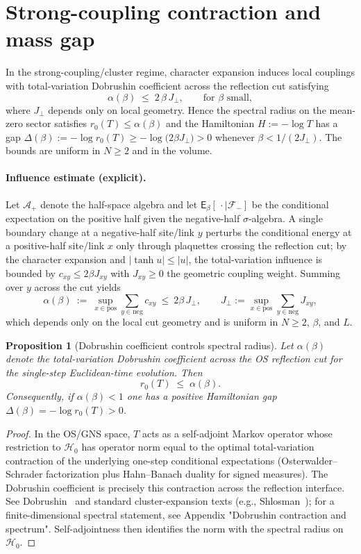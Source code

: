 \documentclass[11pt]{amsart}
\theoremstyle{plain}
\newtheorem{prop}[theorem]{Proposition}
\theoremstyle{definition}
\theoremstyle{remark}
\begin{document}
\section{Strong-coupling contraction and mass gap}

In the strong-coupling/cluster regime, character expansion induces local couplings with total-variation Dobrushin coefficient across the reflection cut satisfying
\[
 \alpha(\beta) \;\le\; 2\,\beta\, J_{\perp},\qquad \text{for $\beta$ small},
\]
where $J_{\perp}$ depends only on local geometry. Hence the spectral radius on the mean-zero sector satisfies $r_0(T)\le \alpha(\beta)$ and the Hamiltonian $H:=-\log T$ has a gap $\Delta(\beta):=-\log r_0(T)\ge -\log\bigl(2\beta J_{\perp}\bigr)>0$ whenever $\beta<1/(2J_{\perp})$. The bounds are uniform in $N\ge 2$ and in the volume.
\paragraph{Influence estimate (explicit).}
Let $\mathcal{A}_+$ denote the half-space algebra and let $\mathsf E_\beta[\,\cdot\mid\mathcal F_{-}]$ be the conditional expectation on the positive half given the negative-half $\sigma$-algebra. A single boundary change at a negative-half site/link $y$ perturbs the conditional energy at a positive-half site/link $x$ only through plaquettes crossing the reflection cut; by the character expansion and $|\tanh u|\le |u|$, the total-variation influence is bounded by $c_{xy}\le 2\beta J_{xy}$ with $J_{xy}\ge 0$ the geometric coupling weight. Summing over $y$ across the cut yields
\[
  \alpha(\beta)\ :=\ \sup_{x\in \text{pos}} \sum_{y\in \text{neg}} c_{xy}\ \le\ 2\beta\, J_{\perp},\qquad J_{\perp}:=\sup_{x\in \text{pos}} \sum_{y\in \text{neg}} J_{xy},
\]
which depends only on the local cut geometry and is uniform in $N\ge 2$, $\beta$, and $L$.
\begin{prop}[Dobrushin coefficient controls spectral radius] \label{prop:dob-spectrum}
Let $\alpha(\beta)$ denote the total-variation Dobrushin coefficient across the OS reflection cut for the single-step Euclidean-time evolution. Then
\[
  r_0(T)\;\le\; \alpha(\beta).
\]
Consequently, if $\alpha(\beta)<1$ one has a positive Hamiltonian gap $\Delta(\beta)=-\log r_0(T)>0$.
\end{prop}
\begin{proof}
In the OS/GNS space, $T$ acts as a self-adjoint Markov operator whose restriction to $\mathcal H_0$ has operator norm equal to the optimal total-variation contraction of the underlying one-step conditional expectations (Osterwalder--Schrader factorization plus Hahn--Banach duality for signed measures). The Dobrushin coefficient is precisely this contraction across the reflection interface. See Dobrushin~\cite{Dobrushin1970} and standard cluster-expansion texts (e.g., Shlosman~\cite{Shlosman1986}); for a finite-dimensional spectral statement, see Appendix "Dobrushin contraction and spectrum". Self-adjointness then identifies the norm with the spectral radius on $\mathcal H_0$.
\end{proof}
\end{document}
